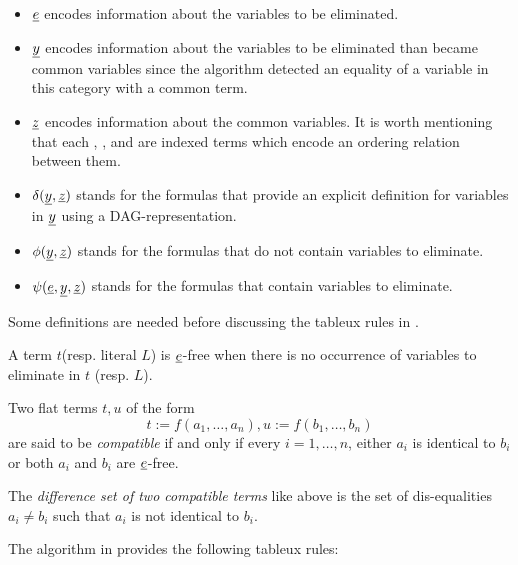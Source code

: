 \begin{itemize}
  \item $\underline{e}$ encodes information about the variables to be eliminated.
  \item $\underline{y}$ encodes information about the variables to be eliminated
    than became common variables since the algorithm detected an equality
    of a variable in this category with a common term.
  \item $\underline{z}$ encodes information about the common variables. It is worth
    mentioning that each , , and  are indexed terms
    which encode an ordering relation between them.
  \item $\delta(\underline{y}, \underline{z})$ stands for the formulas that provide
    an explicit definition for variables in $\underline{y}$ using a DAG-representation.
  \item $\phi(\underline{y}, \underline{z})$ stands for the formulas that do not contain
    variables to eliminate.
  \item $\psi(\underline{e}, \underline{y}, \underline{z})$ stands for the formulas
    that contain variables to eliminate.
\end{itemize}

Some definitions are needed before discussing the tableux rules in 
\cite{ghilardi2020compactly}.

\begin{definition}
  A term $t$(resp. literal $L$) is $\underline{e}$-free when there is no occurrence
  of variables to eliminate in $t$ (resp. $L$).

  Two flat terms $t, u$ of the form 
  \begin{equation*}
    t := f(a_1, \dots, a_n), u := f(b_1, \dots, b_n)
  \end{equation*}
  are said to be \emph{compatible} if and only if every $i = 1, \dots, n$, either
  $a_i$ is identical to $b_i$ or both $a_i$ and $b_i$ are $\underline{e}$-free.

  The \emph{difference set of two compatible terms} like above is the
  set of dis-equalities $a_i \neq b_i$ such that $a_i$ is not identical
  to $b_i$.
\end{definition}

The algorithm in \cite{ghilardi2020compactly} provides the following 
tableux rules:

